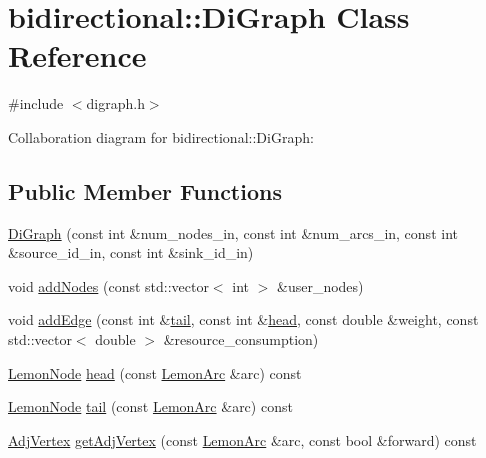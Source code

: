 \hypertarget{classbidirectional_1_1DiGraph}{}\section{bidirectional\+:\+:Di\+Graph Class Reference}
\label{classbidirectional_1_1DiGraph}


{\ttfamily \#include $<$digraph.\+h$>$}



Collaboration diagram for bidirectional\+:\+:Di\+Graph\+:
\subsection*{Public Member Functions}
\begin{DoxyCompactItemize}
\item 
\hyperlink{classbidirectional_1_1DiGraph_a8c15d18a0760e40039441081aa88a51b}{Di\+Graph} (const int \&num\+\_\+nodes\+\_\+in, const int \&num\+\_\+arcs\+\_\+in, const int \&source\+\_\+id\+\_\+in, const int \&sink\+\_\+id\+\_\+in)
\item 
void \hyperlink{classbidirectional_1_1DiGraph_a483c50e9b5b483472ae7ee2910f3bcda}{add\+Nodes} (const std\+::vector$<$ int $>$ \&user\+\_\+nodes)
\item 
void \hyperlink{classbidirectional_1_1DiGraph_acc46372f63c1736a81a11b6b533c564b}{add\+Edge} (const int \&\hyperlink{classbidirectional_1_1DiGraph_a0be9d9f87409f523306babcfef8a7f46}{tail}, const int \&\hyperlink{classbidirectional_1_1DiGraph_aa0379cf603a76b85a8ef3ca5ad03d4af}{head}, const double \&weight, const std\+::vector$<$ double $>$ \&resource\+\_\+consumption)
\item 
\hyperlink{digraph_8h_a9e28ff6f29770c88642a42cab9f42fed}{Lemon\+Node} \hyperlink{classbidirectional_1_1DiGraph_aa0379cf603a76b85a8ef3ca5ad03d4af}{head} (const \hyperlink{digraph_8h_ae6cfd87753a14ebe6d11871314aff34d}{Lemon\+Arc} \&arc) const
\item 
\hyperlink{digraph_8h_a9e28ff6f29770c88642a42cab9f42fed}{Lemon\+Node} \hyperlink{classbidirectional_1_1DiGraph_a0be9d9f87409f523306babcfef8a7f46}{tail} (const \hyperlink{digraph_8h_ae6cfd87753a14ebe6d11871314aff34d}{Lemon\+Arc} \&arc) const
\item 
\hyperlink{structbidirectional_1_1AdjVertex}{Adj\+Vertex} \hyperlink{classbidirectional_1_1DiGraph_a5cd2ea6516bd348ca542115cbc94b239}{get\+Adj\+Vertex} (const \hyperlink{digraph_8h_ae6cfd87753a14ebe6d11871314aff34d}{Lemon\+Arc} \&arc, const bool \&forward) const

\end{DoxyCompactItemize}
